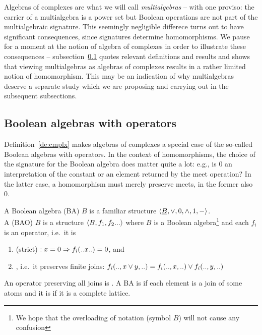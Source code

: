 \documentclass[10pt]{article}
\begin{document}
Algebras of complexes are what we will call {\em multialgebras\/} 
-- with one proviso: the carrier of a multialgebra is a power set but Boolean
operations are not part of the multialgebraic signature. This seemingly negligible
differece turns out to have significant consequences, since signatures
determine homomorphisms.
We pause for a moment at the notion of algebra of complexes in
order to illustrate these consequences -- subsection~\ref{sub:bao} quotes 
relevant definitions and results and shows that viewing multialgebras as 
algebras of complexes results in a rather limited notion of homomorphism.
This may be an indication of why multialgebras deserve a separate
study which we are proposing and carrying out in the subsequent subsections.


\subsection{Boolean algebras with operators}
\label{sub:bao}
Definition~\ref{de:cmplx} makes algebras of complexes a special case of the
so-called Boolean algebras with operators.
In the context of homomorphisms, the choice of the
signature for the Boolean algebra does matter quite a lot: e.g., is 0 an
interpretation of the 
constant or an element returned by the meet operation? In the latter case, 
a homomorphism must merely preserve meets, in the former also 0. 


\begin{Definition}[\cite{JT1}]
A Boolean algebra (BA) $B$ is a familiar structure $\langle\underline {B},\lor,0,\land,1,-\rangle$. \\ 
A  (BAO) $B$ is a structure
$\langle B,f_1,f_2...\rangle$ where $B$ is a Boolean algebra\footnote{We hope
that the overloading of notation (symbol $B$) will not cause any
confusion} and each $f_i$ is an operator, i.e.\ it is
\begin{enumerate}\MyLPar
\item {} (strict) $:x=0\Rightarrow f_i(..x..)=0$, and
\item {}, i.e.\ it preserves finite joins: 
      $f_i(..,x\lor y,..) = f_i(..,x,..)\lor f_i(..,y,..)$
\end{enumerate}
An operator preserving all joins is .  A BA
is  if each element is a join of some atoms and it is 
 if it is a complete lattice.
\end{Definition}
\end{document}
